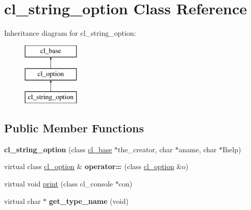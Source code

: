 \hypertarget{classcl__string__option}{
\section{cl\_\-string\_\-option Class Reference}
\label{classcl__string__option}
}
Inheritance diagram for cl\_\-string\_\-option:\begin{figure}[H]
\begin{center}
\leavevmode
\includegraphics[height=3.000000cm]{classcl__string__option}
\end{center}
\end{figure}
\subsection*{Public Member Functions}
\begin{DoxyCompactItemize}
\item 
\hypertarget{classcl__string__option_ac53f7804fcf03d5dde133c98f656d11c}{
{\bfseries cl\_\-string\_\-option} (class \hyperlink{classcl__base}{cl\_\-base} $\ast$the\_\-creator, char $\ast$aname, char $\ast$Ihelp)}
\label{classcl__string__option_ac53f7804fcf03d5dde133c98f656d11c}

\item 
\hypertarget{classcl__string__option_a95be9951ea38ddb294c0130d4f49c5f5}{
virtual class \hyperlink{classcl__option}{cl\_\-option} \& {\bfseries operator=} (class \hyperlink{classcl__option}{cl\_\-option} \&o)}
\label{classcl__string__option_a95be9951ea38ddb294c0130d4f49c5f5}

\item 
virtual void \hyperlink{classcl__string__option_a4248fdd667d4d76597e69748bab52819}{print} (class cl\_\-console $\ast$con)
\item 
\hypertarget{classcl__string__option_ab0667f92081b84257e5c649a1ac91645}{
virtual char $\ast$ {\bfseries get\_\-type\_\-name} (void)}
\label{classcl__string__option_ab0667f92081b84257e5c649a1ac91645}

\end{DoxyCompactItemize}


